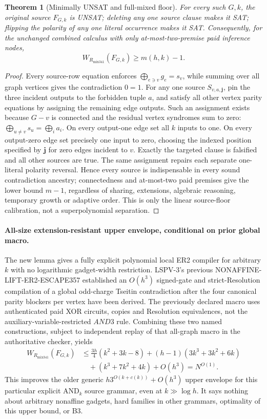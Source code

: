 \documentclass[11pt]{article}
\newtheorem{theorem}{Theorem}
\begin{document}
\begin{theorem}[Minimally UNSAT and full-mixed floor]
For every such $G,k$, the original source $F_{G,k}$ is UNSAT; deleting any one source clause makes it SAT; flipping the polarity of any one literal occurrence makes it SAT. Consequently, for the unchanged combined calculus with only at-most-two-premise paid inference nodes,
\[
\boxed{W_{R_{\mathrm{mix341}}}(F_{G,k})\ge m(h,k)-1.}
\tag{3}
\]
\end{theorem}
\begin{proof}
Every source-row equation enforces $\bigoplus_{e\ni v}g_e=s_v$, while summing over all graph vertices gives the contradiction $0=1$. For any one source $S_{v,a,\mathbf j}$, pin the three incident outputs to the forbidden tuple $a$, and satisfy all other vertex parity equations by assigning the remaining edge outputs. Such an assignment exists because $G-v$ is connected and the residual vertex syndromes sum to zero: $\bigoplus_{u\ne v}s_u=\bigoplus_i a_i$. On every output-one edge set all $k$ inputs to one. On every output-zero edge set precisely one input to zero, choosing the indexed position specified by $\mathbf j$ for zero edges incident to $v$. Exactly the targeted clause is falsified and all other sources are true. The same assignment repairs each separate one-literal polarity reversal. Hence every source is indispensable in every sound contradiction ancestry; connectedness and at-most-two paid premises give the lower bound $m-1$, regardless of sharing, extensions, algebraic reasoning, temporary growth or adaptive order. This is only the linear source-floor calibration, not a superpolynomial separation.
\end{proof}

\paragraph{All-size extension-resistant upper envelope, conditional on prior global macro.}
The new lemma gives a fully explicit polynomial local ER2 compiler for arbitrary $k$ with no logarithmic gadget-width restriction. LSPV-3's previous NONAFFINE-LIFT-ER2-ESCAPE357 established an $O(h^3)$ signed-gate and strict-Resolution compilation of a global odd-charge Tseitin contradiction after the four canonical parity blockers per vertex have been derived. The previously declared macro uses authenticated paid XOR circuits, copies and Resolution equivalences, not the auxiliary-variable-restricted $AND3$ rule. Combining these two named constructions, subject to independent replay of that all-graph macro in the authoritative checker, yields
\[
\boxed{\begin{aligned}
W_{R_{\mathrm{mix341}}}(F_{G,k})
&\le \frac{3h}{4}(k^2+3k-8)
+(h-1)(3k^3+3k^2+6k)\\
&\quad +(k^3+7k^2+4k)+O(h^3)
=N^{O(1)}.
\end{aligned}}
\tag{4}
\]
This improves the older generic $h3^{O(k+c(k))}+O(h^3)$ upper envelope for this particular explicit $\mathrm{AND}_k$ source grammar, even at $k\gg\log h$. It says nothing about arbitrary nonaffine gadgets, hard families in other grammars, optimality of this upper bound, or B3.
\end{document}
